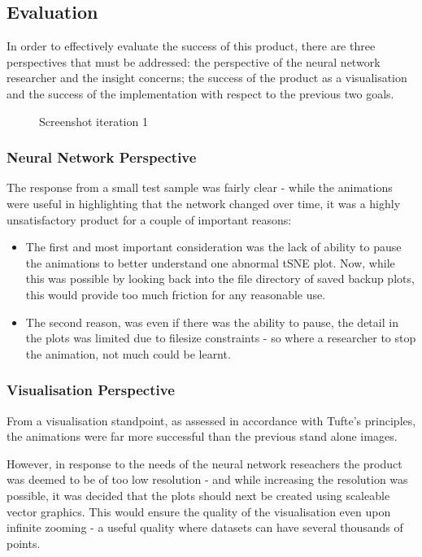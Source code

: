 \documentclass[a4paper,11pt,titlepage]{article}
\begin{document}
	\subsection{Evaluation}
	In order to effectively evaluate the success of this product, there are three perspectives that must be addressed: the perspective of the neural network researcher and the insight concerns; the success of the product as a visualisation and the success of the implementation with respect to the previous two goals.
	
	\begin{figure}[H]
    			\caption{Screenshot iteration 1}%
	\end{figure}		
	
		\subsubsection{Neural Network Perspective}
		The response from a small test sample was fairly clear - while the animations were useful in highlighting that the network changed over time, it was a highly unsatisfactory product for a couple of important reasons: 
		\begin{itemize}
			\item The first and most important consideration was the lack of ability to pause the animations to better understand one abnormal tSNE plot. Now, while this was possible by looking back into the file directory of saved backup plots, this would provide too much friction for any reasonable use.
			\item The second reason, was even if there was the ability to pause, the detail in the plots was limited due to filesize constraints - so where a researcher to stop the animation, not much could be learnt.
		\end{itemize}
		
		\subsubsection{Visualisation Perspective}
		From a visualisation standpoint, as assessed in accordance with Tufte's principles, the animations were far more successful than the previous stand alone images.
		\par 
		However, in response to the needs of the neural network reseachers the product was deemed to be of too low resolution - and while increasing the resolution was possible, it was decided that the plots should next be created using scaleable vector graphics. This would ensure the quality of the visualisation even upon infinite zooming - a useful quality where datasets can have several thousands of points. 
\end{document}
